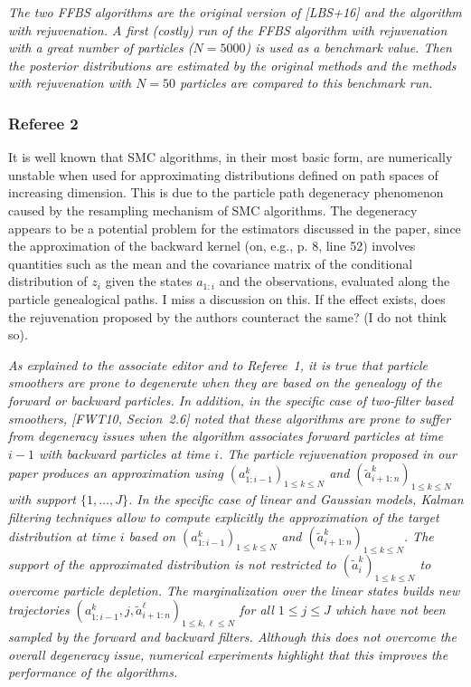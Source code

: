 \vspace{.2cm}

{\em 
\noindent The two FFBS algorithms are the original version of [LBS+16]  and the algorithm with rejuvenation.
A first (costly) run of the FFBS algorithm with rejuvenation with a great number of particles ($N=5000$) is used as a benchmark value. Then the posterior distributions are estimated by the original methods and the methods with rejuvenation with $N=50$ particles are compared to this  benchmark run.
}

\subsubsection*{Referee 2}
\noindent It is well known that SMC algorithms, in their most basic form, are numerically unstable
when used for approximating distributions defined on path spaces of increasing dimension. This is due to the particle path degeneracy phenomenon caused by the resampling mechanism of SMC algorithms. The degeneracy appears to be a potential problem for the estimators discussed in the paper, since the approximation of the
backward kernel (on, e.g., p. 8, line 52) involves quantities such as the mean and the
covariance matrix of the conditional distribution of $z_i$ given the states $a_{1:i}$ and the observations,
evaluated along the particle genealogical paths. I miss a discussion on this. If the effect exists, does the rejuvenation proposed by the authors counteract the same? (I do not think so).

\vspace{.2cm}
{\em
\noindent As explained to the associate editor and to  Referee~1, it is true that particle smoothers are prone to degenerate when they are based on  the genealogy of the forward or backward particles. In addition, in the specific case of two-filter based smoothers, [FWT10, Secion~2.6] noted that these algorithms are prone to suffer from degeneracy issues when the algorithm associates forward particles at time $i-1$ with backward particles at time $i$. 
The particle rejuvenation proposed in our paper produces an approximation using $(a^k_{1:i-1})_{1\le k \le N}$ and $(\tilde{a}^k_{i+1:n})_{1\le k \le N}$ with support $\{1,\ldots,J\}$. In the specific case of linear and Gaussian models, Kalman filtering techniques allow to compute explicitly the approximation of the target distribution at time $i$ based on  $(a^k_{1:i-1})_{1\le k \le N}$ and $(\tilde{a}^k_{i+1:n})_{1\le k \le N}$. The support of the approximated distribution is not restricted to $(\tilde{a}^k_{i})_{1\le k \le N}$ to overcome particle depletion. The marginalization over the linear states  builds new trajectories $(a^k_{1:i-1},j,\tilde{a}^\ell_{i+1:n})_{1\le k,\ell \le N}$ for all $1\le j \le J$ which have not been sampled by the forward and backward filters. Although this does not overcome the overall degeneracy issue, numerical experiments highlight that this improves the performance of the algorithms.
}



